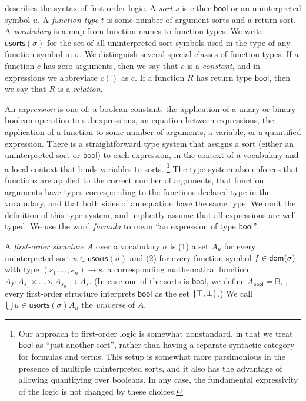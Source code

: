  describes the syntax of first-order logic.
A \emph{sort} $s$ is either $\mathsf{bool}$ or an uninterpreted symbol $u$.
A \emph{function type} $t$ is some number of argument sorts and a return sort.
A \emph{vocabulary} is a map from function names to function types.
We write $\mathsf{usorts}(\sigma)$ for the set of all uninterpreted sort
  symbols used in the type of any function symbol in $\sigma$.
We distinguish several special classes of function types.
If a function $c$ has zero arguments,
  then we say that $c$ is a \emph{constant},
  and in expressions we abbreviate $c()$ as $c$.
If a function $R$ has return type $\mathsf{bool}$,
  then we say that $R$ is a \emph{relation}.

An \emph{expression} is one of: a boolean constant,
  the application of a unary or binary boolean operation to subexpressions,
  an equation between expressions,
  the application of a function to some number of arguments,
  a variable,
  or a quantified expression.
There is a straightforward type system
  that assigns a sort (either an uninterpreted sort or $\mathsf{bool}$) to each expression,
  in the context of a vocabulary and a local context that binds variables to sorts.%
\footnote{Our approach to first-order logic is somewhat nonstandard,
in that we treat $\mathsf{bool}$ as ``just another sort'',
rather than having a separate syntactic category for formulas and terms.
This setup is somewhat more parsimonious in the presence of multiple uninterpreted sorts,
and it also has the advantage of allowing quantifying over booleans.
In any case, the fundamental expressivity of the logic is not changed by these choices.}
The type system also enforces that functions are applied to the correct number of arguments,
  that function arguments have types corresponding to the functions declared type in the vocabulary,
  and that both sides of an equation have the same type.
We omit the definition of this type system, and implicitly assume that all expressions are well typed.
We use the word \emph{formula} to mean ``an expression of type $\mathsf{bool}$''.

A \emph{first-order structure} $A$ over a vocabulary $\sigma$ is
 (1) a set $A_u$ for every uninterpreted sort $u\in\mathsf{usorts}(\sigma)$ and
 (2) for every function symbol $f\in\mathsf{dom}(\sigma)$
     with type $(s_1, \dots, s_n)\to s$,
     a corresponding mathematical function
     $A_f : A_{s_1} \times \dots \times A_{s_n} \to A_s$.
(In case one of the sorts is $\mathsf{bool}$, we define
  $A_{\mathsf{bool}} = \mathbb{B}$,
  \ie, every first-order structure interprets $\mathsf{bool}$
  as the set $\left\{{\top,\bot}\right\}$.)
We call $\bigcup{u\in\mathsf{usorts}(\sigma)} A_u$ the \emph{universe} of $A$.

